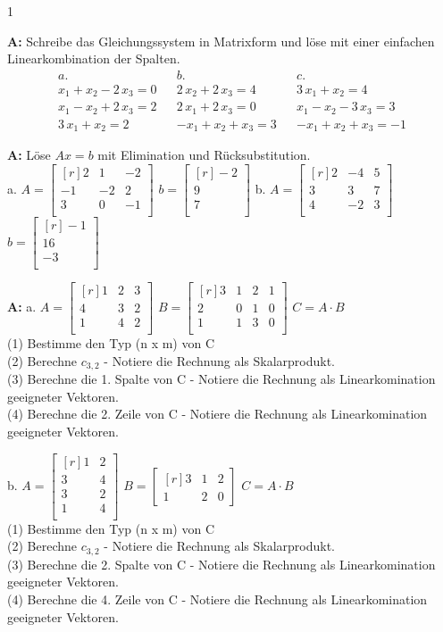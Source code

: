 \documentclass[landscape,twocolumn,a4paper]{article}
\newcommand{\matrixdd}[9]{\ensuremath{\begin{bmatrix*}[r] #1 & #2 & #3 \\  #4 & #5 & #6\\ #7 & #8 & #9 \\ \end{bmatrix*}}}
\newcommand{\vectord}[3]{\ensuremath{\begin{bmatrix*}[r] #1 \\#2 \\#3 \\ \end{bmatrix*}}}
\begin{document}
\setcounter {y} {1}
\parindent 0mm
\bigskip


  
\textbf{A:}   
Schreibe das Gleichungssystem in Matrixform und löse mit einer einfachen Linearkombination der Spalten.
 \begin{align*} 
a.  &  &  b. & & c. \\
 x_{1} + x_{2} - 2 \, x_{3} = 0 & &  2 \, x_{2} + 2 \, x_{3} = 4   & &   3 \, x_{1} + x_{2} = 4   \\
 x_{1} - x_{2} + 2 \, x_{3} = 2  & & 2 \, x_{1} + 2 \, x_{3} = 0  & & x_{1} - x_{2} - 3 \, x_{3} = 3   \\
 3 \, x_{1} + x_{2} = 2 & & -x_{1} + x_{2} + x_{3} = 3  & & -x_{1} + x_{2} + x_{3} = -1 
 \end{align*} 
 
\bigskip {}
 

\textbf{A:}   
Löse $Ax = b$ mit Elimination und Rücksubstitution. \\

a.  $A =\matrixdd{2}{1}{-2}{-1}{-2}{2}{3}{0}{-1}$ \quad $b = \vectord{-2}{9}{7}$  \quad
b.  $A =\matrixdd{2}{-4}{5}{3}{3}{7}{4}{-2}{3}$ \quad $b = \vectord{-1}{16}{-3}$ 
\bigskip {}

\textbf{A:}   
a.
$A =\matrixdd{1}{2}{3}{4}{3}{2}{1}{4}{2}$  \quad
 $B =\begin{bmatrix*}[r] 3 & 1 & 2 & 1\\  2 & 0 & 1 & 0\\ 1 & 1 & 3 & 0\\ \end{bmatrix*}$  \quad
 $C = A \cdot B$  \\ 
 (1) Bestimme den Typ (n x m) von C \\
 (2) Berechne $c_{3,2}$ - Notiere die Rechnung als Skalarprodukt.\\
 (3) Berechne die 1. Spalte von C  - Notiere die Rechnung als Linearkomination geeigneter Vektoren. \\
 (4) Berechne die 2. Zeile von C  - Notiere die Rechnung als Linearkomination geeigneter Vektoren. 

 \vspace{10pt}
 
 b.
$A =\begin{bmatrix*}[r] 1 & 2\\  3 & 4 \\  3 & 2\\ 1 & 4 \\ \end{bmatrix*}$  \quad
 $B =\begin{bmatrix*}[r] 3 & 1 & 2 \\  1 & 2 &  0 \end{bmatrix*}$  \quad
 $C = A \cdot B$   \\
 (1) Bestimme den Typ (n x m) von C \\
 (2) Berechne $c_{3,2}$ - Notiere die Rechnung als Skalarprodukt.\\
 (3) Berechne die 2. Spalte von C  - Notiere die Rechnung als Linearkomination geeigneter Vektoren. \\
 (4) Berechne die 4. Zeile von C  - Notiere die Rechnung als Linearkomination geeigneter Vektoren. 
\end{document}
